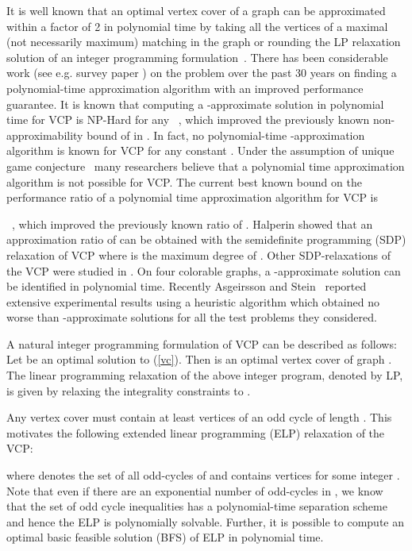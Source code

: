 \documentclass[12pt]{article}
\begin{document}
It is well known that an optimal vertex cover of a graph can be
approximated within a factor of 2 in polynomial time by taking all
the vertices of a maximal (not necessarily maximum) matching in the
graph or rounding the LP relaxation solution of an integer
programming formulation~\cite{nt75}. There has been considerable
work (see e.g. survey paper \cite{hoch}) on the problem over the
past 30 years on finding a polynomial-time approximation algorithm
with an improved performance guarantee.  It is known that computing
a -approximate solution in polynomial time for VCP is
NP-Hard for any ~\cite{dinur},
which improved the previously known non-approximability bound of
 in \cite{hastad97}. In fact, no polynomial-time
-approximation algorithm is known for VCP for any
constant . Under the assumption of unique game
conjecture~\cite{harb,khot1,khot} many researchers believe that a
polynomial time  approximation algorithm is not possible
for VCP. The current best known bound on the performance ratio of a
polynomial time approximation algorithm for VCP is

 ~\cite{kara05},  which improved the
previously known ratio of 
\cite{bar85,monien85}.  Halperin \cite{halperin02} showed that an
approximation ratio of  can
be obtained with the semidefinite programming (SDP) relaxation of
VCP where  is the maximum degree of . Other
 SDP-relaxations of the VCP were studied in
 \cite{charikar,goemans98}. On four colorable graphs, a -approximate solution can be identified
 in polynomial time.
 Recently Asgeirsson and Stein~\cite{stein,stein1} reported extensive
experimental results using a heuristic algorithm which obtained no
worse than -approximate solutions for all the test
problems they considered.


\vskip 5pt
A natural integer programming formulation of VCP can be described as follows:\\

Let  be an optimal
solution  to (\ref{vc}). Then   is an
optimal vertex cover of graph . The linear programming relaxation
of the above integer program, denoted by LP, is given by relaxing the integrality constraints to .

\vskip 5pt

Any vertex cover must contain at least  vertices of an odd
cycle of length  . This motivates  the following extended
linear programming (ELP) relaxation  of the VCP:

where  denotes the set of all odd-cycles of   and
 contains  vertices for some integer
. Note that even if there are an exponential number of
odd-cycles in  , we know that the set of odd cycle inequalities
has a polynomial-time separation scheme and hence the ELP is
polynomially solvable. Further, it is possible to compute an optimal
basic feasible solution (BFS) of ELP in polynomial time.
\end{document}
